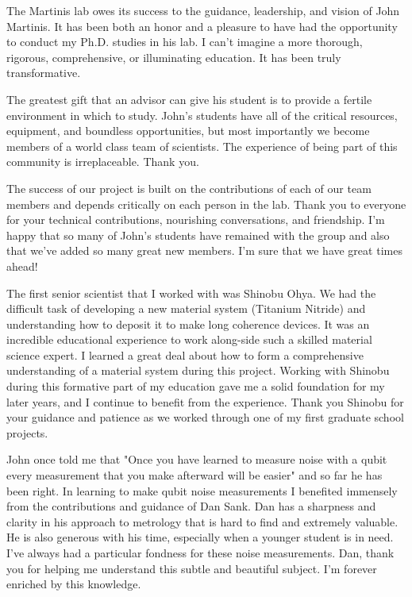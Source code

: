 \begin{acknowledgements}

The Martinis lab owes its success to the guidance, leadership, and vision of John Martinis.
It has been both an honor and a pleasure to have had the opportunity to conduct my Ph.D. studies in his lab.
I can't imagine a more thorough, rigorous, comprehensive, or illuminating education.  It has been truly transformative.

The greatest gift that an advisor can give his student is to provide a fertile environment in which to study.
John's students have all of the critical resources, equipment, and boundless opportunities, but most importantly we become members of a world class team of scientists.
The experience of being part of this community is irreplaceable.  Thank you.

The success of our project is built on the contributions of each of our team members and depends critically on each person in the lab.
Thank you to everyone for your technical contributions, nourishing conversations, and friendship.
I'm happy that so many of John's students have remained with the group and also that we've added so many great new members.
I'm sure that we have great times ahead!

The first senior scientist that I worked with was Shinobu Ohya.
We had the difficult task of developing a new material system (Titanium Nitride) and understanding how to deposit it to make long coherence devices.
It was an incredible educational experience to work along-side such a skilled material science expert.
I learned a great deal about how to form a comprehensive understanding of a material system during this project.
Working with Shinobu during this formative part of my education gave me a solid foundation for my later years, and I continue to benefit from the experience.
Thank you Shinobu for your guidance and patience as we worked through one of my first graduate school projects.

John once told me that "Once you have learned to measure noise with a qubit every measurement that you make afterward will be easier" and so far he has been right.
In learning to make qubit noise measurements I benefited immensely from the contributions and guidance of Dan Sank.
Dan has a sharpness and clarity in his approach to metrology that is hard to find and extremely valuable.
He is also generous with his time, especially when a younger student is in need.
I've always had a particular fondness for these noise measurements.
Dan, thank you for helping me understand this subtle and beautiful subject.
I'm forever enriched by this knowledge.


\end{acknowledgements}
